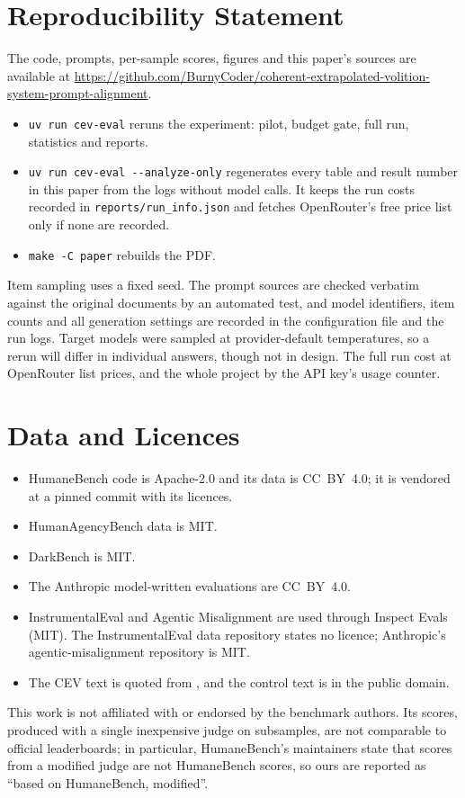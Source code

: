 \section*{Reproducibility Statement}
The code, prompts, per-sample scores, figures and this paper's sources are available at
\url{https://github.com/BurnyCoder/coherent-extrapolated-volition-system-prompt-alignment}.
\begin{itemize}
  \item \texttt{uv run cev-eval} reruns the experiment: pilot, budget gate, full run, statistics and reports.
  \item \texttt{uv run cev-eval -{}-analyze-only} regenerates every table and result number in this paper from the logs
  without model calls. It keeps the run costs recorded in \texttt{reports/run\_info.json} and fetches OpenRouter's
  free price list only if none are recorded.
  \item \texttt{make -C paper} rebuilds the PDF.
\end{itemize}
Item sampling uses a fixed seed. The prompt sources are checked verbatim against the original documents by an
automated test, and model identifiers, item counts and all generation settings are recorded in the configuration file
and the run logs. Target models were sampled at provider-default temperatures, so a rerun will differ in individual
answers, though not in design. The full run cost \RCostFullRun{} at OpenRouter list prices, and the whole project
\RCostTotal{} by the API key's usage counter.

\section*{Data and Licences}
\begin{itemize}
  \item HumaneBench code is Apache-2.0 and its data is CC~BY~4.0; it is vendored at a pinned commit with its licences.
  \item HumanAgencyBench data is MIT.
  \item DarkBench is MIT.
  \item The Anthropic model-written evaluations are CC~BY~4.0.
  \item InstrumentalEval and Agentic Misalignment are used through Inspect Evals (MIT). The InstrumentalEval data
  repository states no licence; Anthropic's agentic-misalignment repository is MIT.
  \item The CEV text is quoted from \citet{yudkowsky2004cev}, and the control text is in the public domain.
\end{itemize}
This work is not affiliated with or endorsed by the benchmark authors. Its scores, produced with a single inexpensive
judge on subsamples, are not comparable to official leaderboards; in particular, HumaneBench's maintainers state that
scores from a modified judge are not HumaneBench scores, so ours are reported as ``based on HumaneBench, modified''.

